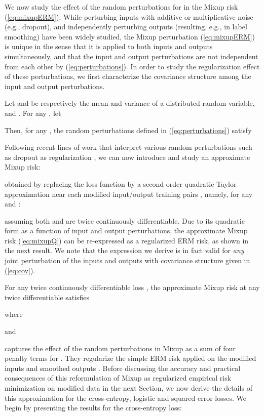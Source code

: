 \documentclass[twoside,11pt]{article}
\newcommand{\rev}[1]{{#1}}
\begin{document}
We now study the effect of the random perturbations  for  in the Mixup risk (\ref{eq:mixupERM}). While perturbing inputs with additive or multiplicative noise (e.g., dropout), and independently perturbing outputs (resulting, e.g., in label smoothing) have been widely studied, the Mixup perturbation (\ref{eq:mixupERM}) is unique in the sense that it is applied to both inputs and outputs simultaneously, and that the input and output perturbations are not independent from each other by (\ref{eq:perturbations}). 
In order to study the regularization effect of these perturbations, we first characterize the covariance structure among the input and output perturbations.
\begin{lemma}\label{lem:corr}
Let  and  be respectively the mean and variance of a  distributed random variable, and . For any , let

Then, for any , the random perturbations defined in (\ref{eq:perturbations}) satisfy

\end{lemma}

Following recent lines of work that interpret various random perturbations such as dropout as regularization \citep{wager2013dropout,wei2020implicit}, we can now introduce and study an approximate Mixup risk:

obtained by replacing the loss function  by a second-order quadratic Taylor approximation near each modified input/output training pairs , namely, for any  and :

assuming both  and  are twice continuously differentiable. Due to its quadratic form as a function of input and output perturbations, the approximate Mixup risk (\ref{eq:mixupQ}) can be re-expressed as a regularized ERM risk, as shown in the next result. We note that the expression we derive is in fact valid for \emph{any} joint perturbation of the inputs and outputs with covariance structure given in (\ref{eq:cov}).

\begin{theorem}\label{thm:mixupreg}
For any twice continuously differentiable loss , the approximate Mixup risk at any twice differentiable  satisfies

where

and

\end{theorem}

 captures the effect of the random perturbations in Mixup as a sum of four penalty terms  for . 
They regularize the simple ERM risk applied on the modified inputs  and smoothed outputs . 
\rev{Before discussing the accuracy and practical consequences of this reformulation of Mixup as regularized empirical risk minimization on modified data in the next Section, we now derive the details of this approximation for the cross-entropy, logistic and squared error losses.}
We begin by presenting the results for the cross-entropy loss:
\end{document}
